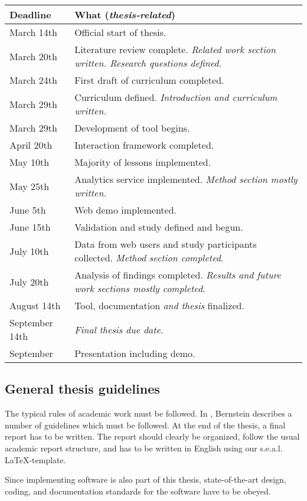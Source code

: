 \documentclass{task_description}
\begin{document}
\begin{tabular}{lp{10cm}}
Deadline & What (\emph{thesis-related}) \\
\hline\noalign{\smallskip}
March 14th   & Official start of thesis. \\
March 20th  & Literature review complete. \emph{Related work section written. Research questions defined.} \\
March 24th  & First draft of curriculum completed. \\
March 29th  & Curriculum defined. \emph{Introduction and curriculum written.} \\
March 29th  & Development of tool begins. \\
April 20th  & Interaction framework completed. \\
May 10th    & Majority of lessons implemented. \\
May 25th    & Analytics service implemented. \emph{Method section mostly written.} \\
June 5th    & Web demo implemented. \\
June 15th   & Validation and study defined and begun. \\
July 10th   & Data from web users and study participants collected. \emph{Method section completed}. \\
July 20th   & Analysis of findings completed. \emph{Results and future work sections mostly completed}. \\
August 14th   & Tool, documentation \emph{and thesis} finalized. \\
September 14th & \emph{Final thesis due date}. \\
September   & Presentation including demo. \\
\end{tabular}

\subsection*{General thesis guidelines}

The typical rules of academic work must be followed. In
\cite{Bernstein2005-daguide}, Bernstein describes a number of guidelines which
must be followed. At the end of the thesis, a final report has to be
written. The report should clearly be organized, follow the usual academic
report structure, and has to be written in English using our
s.e.a.l. \LaTeX-template.

Since implementing software is also part of this thesis, state-of-the-art
design, coding, and documentation standards for the software have to be obeyed.
\end{document}
